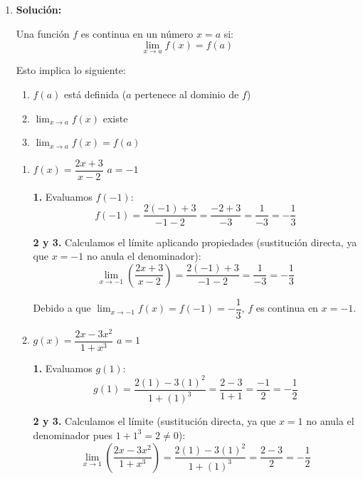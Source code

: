 \documentclass[12pt]{article}
\newcommand{\solucion}{%
    \vspace{0.8em}%
    \textbf{Solución:}%
}
\begin{document}
\begin{enumerate}[label=\alph*.-]

    \item
    \solucion

    Una función $f$ es continua en un número $x = a$ si:
    \[
    \lim_{x \to a} f(x) = f(a)
    \]

    Esto implica lo siguiente:
    \begin{enumerate}[label=\arabic*.-]
        \item $f(a)$ está definida ($a$ pertenece al dominio de $f$)
        \item $\displaystyle\lim_{x \to a} f(x)$ existe
        \item $\displaystyle\lim_{x \to a} f(x) = f(a)$
    \end{enumerate}

    \begin{enumerate}[label=\roman*.]

        \item $f(x) = \dfrac{2x+3}{x-2}$ \quad $a = -1$

        \textbf{1.} Evaluamos $f(-1)$:
        \[
        f(-1) = \frac{2(-1)+3}{-1-2} = \frac{-2+3}{-3} = \frac{1}{-3} = -\frac{1}{3}
        \]

        \textbf{2 y 3.} Calculamos el límite aplicando propiedades (sustitución directa, ya que $x = -1$ no anula el denominador):
        \[
        \lim_{x \to -1} \left(\frac{2x+3}{x-2}\right) = \frac{2(-1)+3}{-1-2} = \frac{1}{-3} = -\frac{1}{3}
        \]

        Debido a que $\displaystyle\lim_{x \to -1} f(x) = f(-1) = -\dfrac{1}{3}$, $f$ es continua en $x = -1$.

        \vspace{0.5em}
        \item $g(x) = \dfrac{2x - 3x^2}{1 + x^3}$ \quad $a = 1$

        \textbf{1.} Evaluamos $g(1)$:
        \[
        g(1) = \frac{2(1) - 3(1)^2}{1 + (1)^3} = \frac{2 - 3}{1 + 1} = \frac{-1}{2} = -\frac{1}{2}
        \]

        \textbf{2 y 3.} Calculamos el límite (sustitución directa, ya que $x = 1$ no anula el denominador pues $1 + 1^3 = 2 \neq 0$):
        \[
        \lim_{x \to 1} \left(\frac{2x - 3x^2}{1 + x^3}\right) = \frac{2(1) - 3(1)^2}{1 + (1)^3} = \frac{2 - 3}{2} = -\frac{1}{2}
        \]


\end{enumerate}
\end{enumerate}
\end{document}
